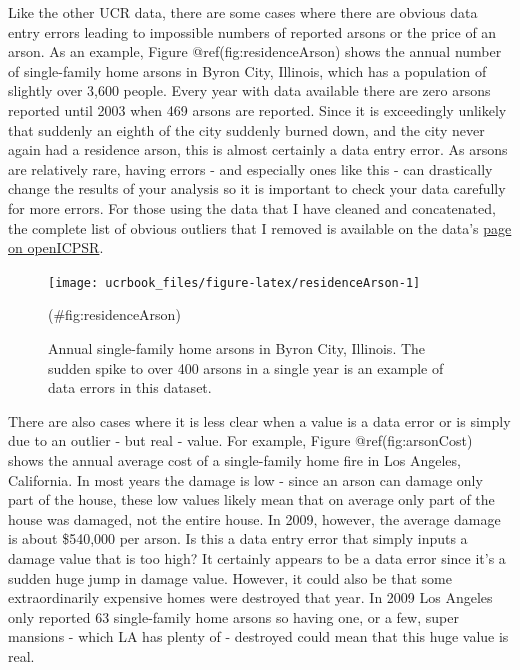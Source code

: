 \documentclass[
  12pt,
  openany]{book}
\begin{document}
Like the other UCR data, there are some cases where there are obvious data entry errors leading to impossible numbers of reported arsons or the price of an arson. As an example, Figure @ref(fig:residenceArson) shows the annual number of single-family home arsons in Byron City, Illinois, which has a population of slightly over 3,600 people. Every year with data available there are zero arsons reported until 2003 when 469 arsons are reported. Since it is exceedingly unlikely that suddenly an eighth of the city suddenly burned down, and the city never again had a residence arson, this is almost certainly a data entry error. As arsons are relatively rare, having errors - and especially ones like this - can drastically change the results of your analysis so it is important to check your data carefully for more errors. For those using the data that I have cleaned and concatenated, the complete list of obvious outliers that I removed is available on the data's \href{https://www.openicpsr.org/openicpsr/project/103540/version/V9/view}{page on openICPSR}.

\begin{figure}

{\centering \texttt{[image: ucrbook\_files/figure-latex/residenceArson-1]} 

}

\caption{Annual single-family home arsons in Byron  City, Illinois. The sudden spike to over 400 arsons in a single year is an example of data errors in this dataset. }(\#fig:residenceArson)
\end{figure}

There are also cases where it is less clear when a value is a data error or is simply due to an outlier - but real - value. For example, Figure @ref(fig:arsonCost) shows the annual average cost of a single-family home fire in Los Angeles, California. In most years the damage is low - since an arson can damage only part of the house, these low values likely mean that on average only part of the house was damaged, not the entire house. In 2009, however, the average damage is about \$540,000 per arson. Is this a data entry error that simply inputs a damage value that is too high? It certainly appears to be a data error since it's a sudden huge jump in damage value. However, it could also be that some extraordinarily expensive homes were destroyed that year. In 2009 Los Angeles only reported 63 single-family home arsons so having one, or a few, super mansions - which LA has plenty of - destroyed could mean that this huge value is real.
\end{document}
